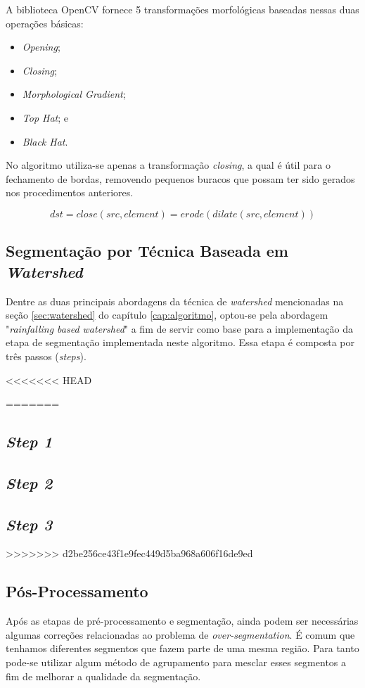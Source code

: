 A biblioteca OpenCV fornece 5 transformações morfológicas baseadas nessas duas operações básicas:
\begin{itemize}
    \item \textit{Opening};
    \item \textit{Closing};
    \item \textit{Morphological Gradient};
    \item \textit{Top Hat}; e 
    \item \textit{Black Hat}.
\end{itemize} 

No algoritmo utiliza-se apenas a transformação \textit{closing}, a qual é útil para o fechamento de bordas, removendo pequenos buracos que possam ter sido gerados nos procedimentos anteriores.

\[dst = close(src, element) = erode(dilate(src, element))\]


\subsection{Segmentação por Técnica Baseada em \textit{Watershed}}
Dentre as duas principais abordagens da técnica de \textit{watershed} mencionadas na seção \ref{sec:watershed} do capítulo \ref{cap:algoritmo}, optou-se pela abordagem "\textit{rainfalling based watershed}" a fim de servir como base para a implementação da etapa de segmentação implementada neste algoritmo. Essa etapa é composta por três passos (\textit{steps}). 

<<<<<<< HEAD

=======
\subsection*{\textit{Step 1}}
 
\subsection*{\textit{Step 2}}

\subsection*{\textit{Step 3}}
>>>>>>> d2be256ce43f1e9fec449d5ba968a606f16de9ed

\subsection{Pós-Processamento}
Após as etapas de pré-processamento e segmentação, ainda podem ser necessárias algumas correções relacionadas ao problema de \textit{over-segmentation}. É comum que tenhamos diferentes segmentos que fazem parte de uma mesma região. Para tanto pode-se utilizar algum método de  agrupamento para mesclar esses segmentos a fim de melhorar a qualidade da segmentação.